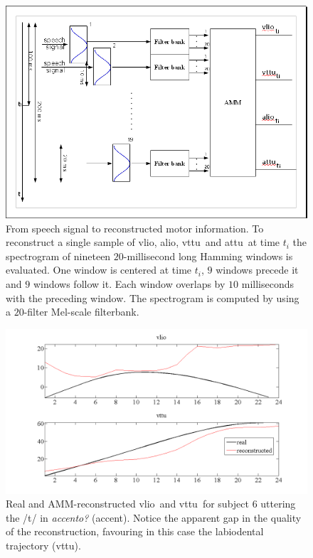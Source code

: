 \documentclass[10pt]{article}
\newcommand{\vlio}{\textsf{vlio}}
\newcommand{\vttu}{\textsf{vttu}}
\newcommand{\alio}{\textsf{alio}}
\newcommand{\attu}{\textsf{attu}}
\begin{document}
\begin{figure}[hb]
  \centerline{\includegraphics[width=\textwidth]{figs/audio2motor}}
\renewcommand{\figurename}{Figure S}
 \caption{From speech signal to reconstructed motor information. To reconstruct
   a single sample of \vlio, \alio, \vttu\ and \attu\ at time $t_i$ the
  spectrogram of nineteen $20$-millisecond long Hamming windows is evaluated.
   One window is centered at time $t_i$, $9$ windows precede it
   and $9$ windows follow it. Each window overlaps by $10$ milliseconds
  with the preceding window. The spectrogram is computed by using a
   $20$-filter Mel-scale filterbank.}
 \label{fig:amm}
\end{figure}


\begin{figure}[hb]
\renewcommand{\figurename}{Figure S}
 \centerline{\includegraphics[width=\textwidth]{figs/recMIs}}
 \caption{Real and AMM-reconstructed \vlio\ and \vttu\ for subject $6$ uttering
    the /t/ in \emph{accento?} (accent). Notice the apparent gap in the quality
   of the reconstruction, favouring in this case the labiodental trajectory (\vttu).}
 \label{fig:example}
\end{figure}
\end{document}
